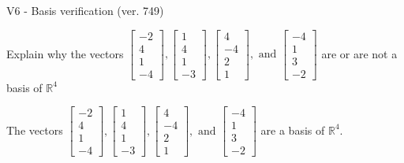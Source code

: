 \begin{exercise}
  \begin{exerciseTitle}V6 - Basis verification (ver. 749)\end{exerciseTitle}
  \begin{exerciseStatement}
    Explain why the vectors \(\left[\begin{array}{r}
-2 \\
4 \\
1 \\
-4
\end{array}\right] , \left[\begin{array}{r}
1 \\
4 \\
1 \\
-3
\end{array}\right] , \left[\begin{array}{r}
4 \\
-4 \\
2 \\
1
\end{array}\right] , \text{ and } \left[\begin{array}{r}
-4 \\
1 \\
3 \\
-2
\end{array}\right]\) are or are not a basis of \(\mathbb{R}^4\)	


  \end{exerciseStatement}
  \begin{exerciseAnswer}
   The vectors \(\left[\begin{array}{r}
-2 \\
4 \\
1 \\
-4
\end{array}\right] , \left[\begin{array}{r}
1 \\
4 \\
1 \\
-3
\end{array}\right] , \left[\begin{array}{r}
4 \\
-4 \\
2 \\
1
\end{array}\right] , \text{ and } \left[\begin{array}{r}
-4 \\
1 \\
3 \\
-2
\end{array}\right]\) 
  	 are  a basis of \(\mathbb{R}^4\).
  


  \end{exerciseAnswer}
\end{exercise}